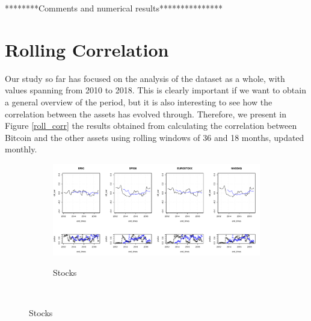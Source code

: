  ********Comments and numerical results***************
 
 \bigskip
\section{Rolling Correlation}
Our study so far has focused on the analysis of the dataset as a whole, with values spanning from 2010 to 2018. This is clearly  important if we want to obtain a general overview of the period, but it is also interesting to see how the correlation between the  assets has evolved through. 
Therefore, we present in Figure \ref{roll_corr} the results obtained from calculating the correlation between Bitcoin and the other assets using  rolling windows of 36 and 18 months, updated monthly.


\begin{figure}
	\centering
	\begin{subfigure}{\textwidth}
		\centering
		\includegraphics[width=0.8\linewidth]{Images/rolling_stocks}
		\label{roll_stocks}
		\caption{Stocks}
	\end{subfigure}\\


\end{figure}
